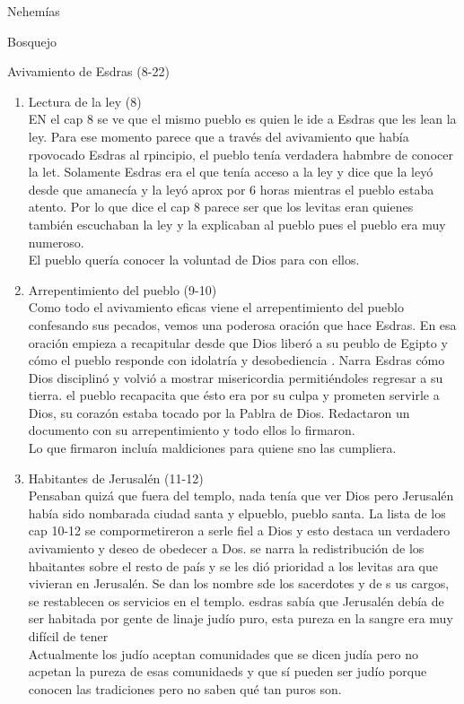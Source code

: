 \documentclass[12pt]{article}
\begin{document}
\begin{section}{Nehemías}
\begin{subsection}{Bosquejo}
\begin{subsubsection}{Avivamiento de Esdras (8-22)}
			\begin{enumerate}
				\item Lectura de la ley (8)\\
					EN el cap 8 se ve que el mismo pueblo es quien le ide a Esdras que les lean la ley. Para ese momento parece que a través del avivamiento que había rpovocado Esdras al rpincipio, el pueblo tenía verdadera habmbre de conocer la let. Solamente Esdras era el que tenía acceso a la ley y dice que la leyó desde que amanecía y la leyó aprox por 6 horas mientras el pueblo estaba atento. Por lo que dice el cap 8 parece ser que los levitas eran quienes también escuchaban la ley y la explicaban al pueblo pues el pueblo era muy numeroso.\\
					El pueblo quería conocer la voluntad de Dios para con ellos.
				\item Arrepentimiento del pueblo (9-10)\\
					Como todo el avivamiento eficas viene el arrepentimiento del pueblo confesando sus pecados, vemos una poderosa oración que hace Esdras. En esa oración empieza a recapitular desde que Dios liberó a su peublo de Egipto y cómo el pueblo responde con idolatría y desobediencia . Narra Esdras cómo Dios disciplinó y volvió a mostrar misericordia permitiéndoles regresar a su tierra. el pueblo recapacita que ésto era por su culpa y prometen servirle a Dios, su corazón estaba tocado por la Pablra de Dios. Redactaron un documento con su arrepentimiento y todo ellos lo firmaron.\\
					Lo que firmaron incluía maldiciones para quiene sno las cumpliera.
				\item Habitantes de Jerusalén (11-12)\\
					Pensaban quizá que fuera del templo, nada tenía que ver Dios pero Jerusalén había sido nombarada ciudad santa y elpueblo, pueblo santa. La lista de los cap 10-12 se compormetireron a serle fiel a Dios y esto destaca un verdadero avivamiento y deseo de obedecer a Dos. se narra la redistribución de los hbaitantes sobre el resto de país y se les dió prioridad a los levitas ara que vivieran en Jerusalén. Se dan los nombre sde los sacerdotes y de s us cargos, se restablecen os servicios en el templo. esdras sabía que Jerusalén debía de ser habitada por gente de linaje judío puro, esta pureza en la sangre era muy difícil de tener \\
					Actualmente los judío aceptan comunidades que se dicen judía pero no acpetan la pureza de esas comunidaeds y que sí pueden ser judío porque conocen las tradiciones pero no saben qué tan puros son. \\

\end{enumerate}
\end{subsubsection}
\end{subsection}
\end{section}
\end{document}
